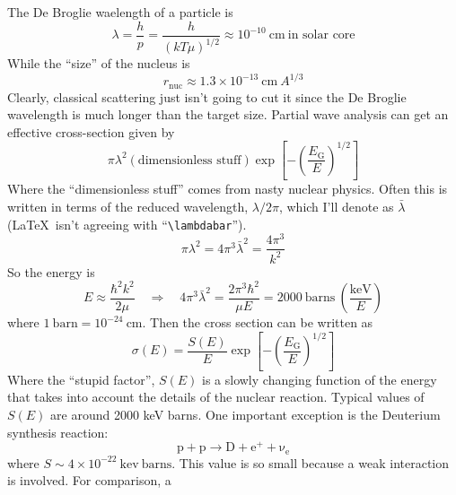 \documentclass[10pt]{article}
\numberwithin{equation}{section}
\begin{document}
  The De Broglie waelength of a particle is 
  \begin{equation}
    \label{eq:121}
    \lambda = \frac{h}{p}=\frac{h}{\left(kT\mu\right)^{1/2}}\approx
    10^{-10}\ \mathrm{cm}\ \textrm{in solar core}
  \end{equation}
  While the ``size'' of the nucleus is
  \begin{equation}
    \label{eq:122}
    r_{\mathrm{nuc}}\approx 1.3\times 10^{-13}\ \mathrm{cm}\ A^{1/3}
  \end{equation}
  Clearly, classical scattering just isn't going to cut it since the
  De Broglie wavelength is much longer than the target size. Partial
  wave analysis can get an effective cross-section given by
  \begin{equation}
    \label{eq:123}
    \pi\lambda^2\left(\textrm{dimensionless stuff}\right)\exp\left[-\left
(\frac{E_\mathrm{G}}{E}\right)^{1/2}\right]
  \end{equation}
  Where the ``dimensionless stuff'' comes from nasty nuclear
  physics. Often this is written in terms of the reduced wavelength,
  $\lambda/2\pi$, which I'll denote as $\bar{\lambda}$ (\LaTeX\ isn't
  agreeing with ``\verb!\lambdabar!'').
  \begin{equation}
    \label{eq:124}
    \pi\lambda^2=4\pi^3\bar{\lambda}^2=\frac{4\pi^3}{k^2}
  \end{equation}
  So the energy is
  \begin{equation}
    \label{eq:125}
    E\approx \frac{\hbar^2k^2}{2\mu}\quad\Rightarrow\quad
    4\pi^3\bar{\lambda}^2=\frac{2\pi^3\hbar^2}{\mu E}=2000\
    \mathrm{barns}\ \left(\frac{\mathrm{keV}}{E}\right)
  \end{equation}
  where $1\ \mathrm{barn}=10^{-24}\ \mathrm{cm}$. Then the cross section can be written as
  \begin{equation}
    \label{eq:126}
    \sigma(E)=\frac{S(E)}{E}\exp\left[-\left(\frac{E_{\mathrm{G}}}{E}
\right)^{1/2}\right]
  \end{equation}
  Where the ``stupid factor'', $S(E)$ is a slowly changing function of
  the energy that takes into account the details of the nuclear
  reaction. Typical values of $S(E)$ are around 2000 keV barns. One
  important exception is the Deuterium synthesis reaction:
  \begin{equation}
    \label{eq:127}
    \mathrm{p+p\to D+e^++\nu_e}
  \end{equation}
  where $S\sim 4\times 10^{-22}\ \mathrm{kev\ barns}$. This value is
  so small because a weak interaction is involved. For comparison, a
\end{document}
